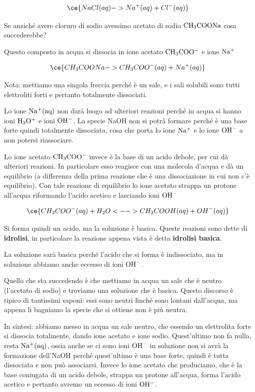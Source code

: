 $$\ce{NaCl(aq) -> Na^+(aq) + Cl^-(aq)}$$

Se anziché avere cloruro di sodio avessimo acetato di sodio $\rm CH_3COONa$ cosa succederebbe?

Questo composto in acqua si dissocia in ione acetato $\rm CH_3COO^-$ e ione $\rm Na^+$

$$\ce{CH_3COONa -> CH_3COO^-(aq) + Na^+(aq)}$$

Nota: mettiamo una singola freccia perché è un sale, e i sali solubili sono tutti elettroliti forti e pertanto totalmente dissociati.

Lo ione $\rm Na^+(aq)$ non darà luogo ad ulteriori reazioni perché in acqua si hanno ioni $\rm H_3O^+$ e ioni $\rm OH^-$. La specie NaOH non si potrà formare perché è una base forte quindi totalmente dissociata, cosa che porta lo ione $\rm Na^+$ e lo ione $\rm OH^-$ a non potersi riassociare.

Lo ione acetato $\rm CH_3COO^-$ invece è la base di un acido debole, per cui dà ulteriori reazioni. In particolare esso reagisce con una molecola d'acqua e dà un equilibrio (a differenza della prima reazione che è una dissociazione in cui non c'è equilibrio). Con tale reazione di equilibrio lo ione acetato strappa un protone all'acqua riformando l'acido acetico e lasciando ioni $\rm OH^-$

$$\ce{CH_3COO^-(aq) + H_2O <--> CH_3COOH(aq) + OH^-(aq)}$$

Si forma quindi un acido, ma la soluzione è basica. Queste reazioni sono dette di \textbf{idrolisi}, in particolare la reazione appena vista è detta \textbf{idrolisi basica}.

La soluzione sarà basica perché l'acido che si forma è indissociato, ma in soluzione abbiamo anche eccesso di ioni $\rm OH^-$.

Quello che sta succedendo è che mettiamo in acqua un sale che è neutro (l'acetato di sodio) e troviamo una soluzione che è basica. Questo discorso è tipico di tantissimi saponi: essi sono neutri finché sono lontani dall'acqua, ma appena li bagniamo la specie che si ottiene non è più neutra.

In sintesi: abbiamo messo in acqua un sale neutro, che essendo un elettrolita forte si dissocia totalmente, dando ione acetato e ione sodio. Quest'ultimo non fa nulla, resta $\rm Na^+(aq)$, ossia anche se ci sono ioni $\rm OH^-$ in soluzione non si avrà la formazione dell'NaOH perché quest'ultimo è una base forte, quindi è tutta dissociata e non può associarsi. Invece lo ione acetato che produciamo, che è la base coniugata di un acido debole, strappa un protone all'acqua, forma l'acido acetico e pertanto avremo un eccesso di ioni $\rm OH^-$.

